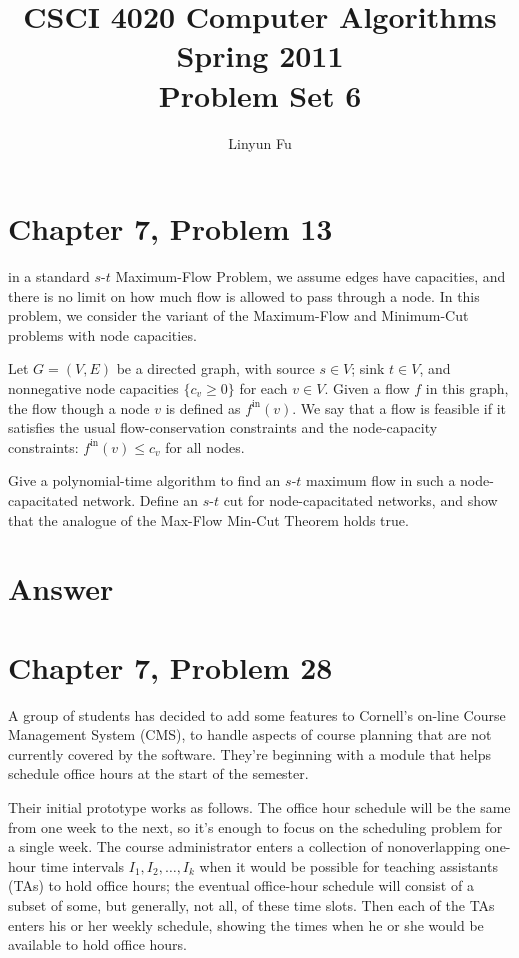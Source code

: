 \documentclass[12pt,letterpaper]{article}
\author{Linyun Fu}
\title{CSCI 4020 Computer Algorithms Spring 2011\\
Problem Set 6}
\begin{document}
\maketitle
\section*{Chapter 7, Problem 13}
in a standard $s$-$t$ Maximum-Flow Problem, we assume edges have capacities,
and there is no limit on how much flow is allowed to pass through a node. In this problem, we consider the variant of the Maximum-Flow and
Minimum-Cut problems with node capacities.

Let $G = (V, E)$ be a directed graph, with source $s \in V$; sink $t \in V$, and
nonnegative node capacities $\{c_v \ge 0\}$ for each $v \in V$. Given a flow $f$ in this
graph, the flow though a node $v$ is defined as $f^{\textrm{in}}(v)$. We say that a flow
is feasible if it satisfies the usual flow-conservation constraints and the
node-capacity constraints: $f^{\textrm{in}}(v)\le c_v$ for all nodes.

Give a polynomial-time algorithm to find an $s$-$t$ maximum flow in
such a node-capacitated network. Define an $s$-$t$ cut for node-capacitated
networks, and show that the analogue of the Max-Flow Min-Cut Theorem
holds true.

\section*{Answer}

\section*{Chapter 7, Problem 28}
A group of students has decided to add some features to Cornell's on-line
Course Management System (CMS), to handle aspects of course planning
that are not currently covered by the software. They're beginning with a
module that helps schedule office hours at the start of the semester.

Their initial prototype works as follows. The office hour schedule will
be the same from one week to the next, so it's enough to focus on the
scheduling problem for a single week. The course administrator enters
a collection of nonoverlapping one-hour time intervals $I_1, I_2, \dots, I_k$ when
it would be possible for teaching assistants (TAs) to hold office hours;
the eventual office-hour schedule will consist of a subset of some, but
generally, not all, of these time slots. Then each of the TAs enters his or
her weekly schedule, showing the times when he or she would be available
to hold office hours.
\end{document}
